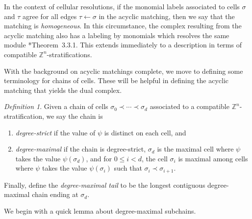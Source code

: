 \documentclass{amsart}
\newcommand{\ZZ}{\mathbb{Z}}
\theoremstyle{remark}
\newtheorem{definition}[theorem]{Definition}
\begin{document}
In the context of cellular resolutions, if the monomial labels associated to cells $\sigma$ and $\tau$ agree for all edges $\tau\leftarrow \sigma$ in the acyclic matching, then we say that the matching is \emph{homogeneous}. In this circumstance, the complex resulting from the acyclic matching also has a labeling by monomials which resolves the same module \cite{Batzies}*{Theorem~3.3.1}. This extends immediately to a description in terms of compatible $\ZZ^n$-stratifications.


With the background on acyclic matchings complete, we move to defining some terminology for chains of cells. These will be helpful in defining the acyclic matching that yields the dual complex.

\begin{definition}
  Given a chain of cells $\sigma_0\prec \cdots \prec \sigma_d$ associated to a compatible $\ZZ^n$-stratification, we say the chain is
\begin{enumerate}
\item \emph{degree-strict} if the value of $\psi$ is distinct on each cell, and
\item \emph{degree-maximal} if the chain is degree-strict, $\sigma_d$ is the maximal cell where $\psi$ takes the value $\psi(\sigma_d)$, and for $0\leq i<d$, the cell $\sigma_i$ is maximal among cells where $\psi$ takes the value $\psi(\sigma_i)$ such that $\sigma_i\prec \sigma_{i+1}$. 
\end{enumerate}

Finally, define the \emph{degree-maximal tail} to be the longest contiguous degree-maximal chain ending at $\sigma_d$.

\end{definition}

We begin with a quick lemma about degree-maximal subchains.
\end{document}

